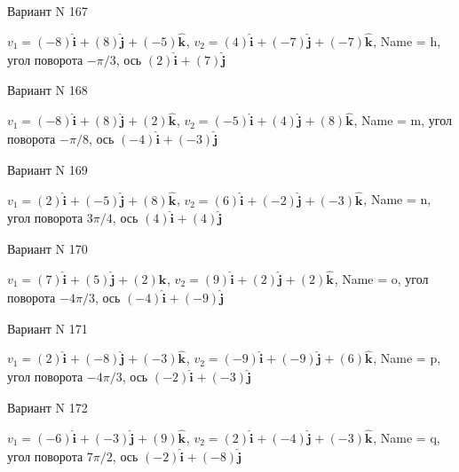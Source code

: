 \documentclass[11pt]{report}
\begin{document}
Вариант N 167

$v_1 = \left(-8\right)\mathbf{\hat{i}_{}} + \left(8\right)\mathbf{\hat{j}_{}} + \left(-5\right)\mathbf{\hat{k}_{}}$, $v_2 = \left(4\right)\mathbf{\hat{i}_{}} + \left(-7\right)\mathbf{\hat{j}_{}} + \left(-7\right)\mathbf{\hat{k}_{}}$, Name = h, угол поворота $- \pi / 3$, ось $\left(2\right)\mathbf{\hat{i}_{}} + \left(7\right)\mathbf{\hat{j}_{}}$

Вариант N 168

$v_1 = \left(-8\right)\mathbf{\hat{i}_{}} + \left(8\right)\mathbf{\hat{j}_{}} + \left(2\right)\mathbf{\hat{k}_{}}$, $v_2 = \left(-5\right)\mathbf{\hat{i}_{}} + \left(4\right)\mathbf{\hat{j}_{}} + \left(8\right)\mathbf{\hat{k}_{}}$, Name = m, угол поворота $- \pi / 8$, ось $\left(-4\right)\mathbf{\hat{i}_{}} + \left(-3\right)\mathbf{\hat{j}_{}}$

Вариант N 169

$v_1 = \left(2\right)\mathbf{\hat{i}_{}} + \left(-5\right)\mathbf{\hat{j}_{}} + \left(8\right)\mathbf{\hat{k}_{}}$, $v_2 = \left(6\right)\mathbf{\hat{i}_{}} + \left(-2\right)\mathbf{\hat{j}_{}} + \left(-3\right)\mathbf{\hat{k}_{}}$, Name = n, угол поворота $3 \pi / 4$, ось $\left(4\right)\mathbf{\hat{i}_{}} + \left(4\right)\mathbf{\hat{j}_{}}$

Вариант N 170

$v_1 = \left(7\right)\mathbf{\hat{i}_{}} + \left(5\right)\mathbf{\hat{j}_{}} + \left(2\right)\mathbf{\hat{k}_{}}$, $v_2 = \left(9\right)\mathbf{\hat{i}_{}} + \left(2\right)\mathbf{\hat{j}_{}} + \left(2\right)\mathbf{\hat{k}_{}}$, Name = o, угол поворота $- 4 \pi / 3$, ось $\left(-4\right)\mathbf{\hat{i}_{}} + \left(-9\right)\mathbf{\hat{j}_{}}$

Вариант N 171

$v_1 = \left(2\right)\mathbf{\hat{i}_{}} + \left(-8\right)\mathbf{\hat{j}_{}} + \left(-3\right)\mathbf{\hat{k}_{}}$, $v_2 = \left(-9\right)\mathbf{\hat{i}_{}} + \left(-9\right)\mathbf{\hat{j}_{}} + \left(6\right)\mathbf{\hat{k}_{}}$, Name = p, угол поворота $- 4 \pi / 3$, ось $\left(-2\right)\mathbf{\hat{i}_{}} + \left(-3\right)\mathbf{\hat{j}_{}}$

Вариант N 172

$v_1 = \left(-6\right)\mathbf{\hat{i}_{}} + \left(-3\right)\mathbf{\hat{j}_{}} + \left(9\right)\mathbf{\hat{k}_{}}$, $v_2 = \left(2\right)\mathbf{\hat{i}_{}} + \left(-4\right)\mathbf{\hat{j}_{}} + \left(-3\right)\mathbf{\hat{k}_{}}$, Name = q, угол поворота $7 \pi / 2$, ось $\left(-2\right)\mathbf{\hat{i}_{}} + \left(-8\right)\mathbf{\hat{j}_{}}$
\end{document}
